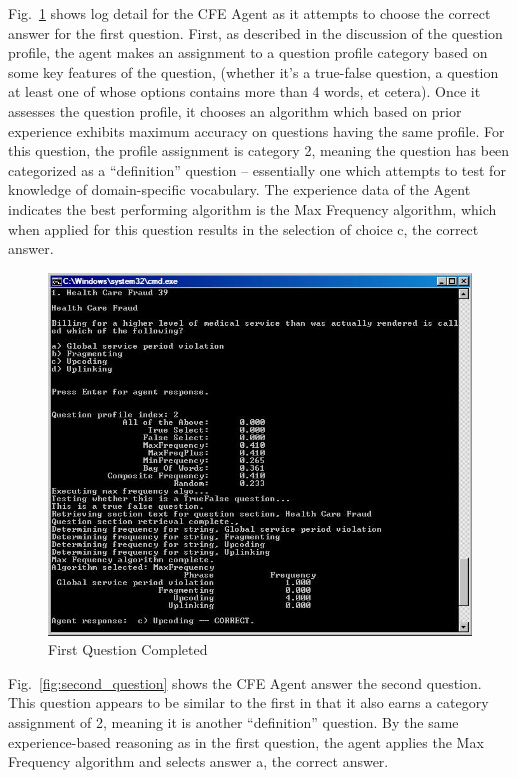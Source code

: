 Fig.~\ref{fig:first_question_completed} shows log detail for the CFE Agent as it attempts to choose the correct answer for the first question.  First, as described in the discussion of the question profile, the agent makes an assignment to a question profile category based on some key features of the question, (whether it's a true-false question, a question at least one of whose options contains more than 4 words, et cetera).  Once it assesses the question profile, it chooses an algorithm which based on prior experience exhibits maximum accuracy on questions having the same profile.  For this question, the profile assignment is category 2, meaning the question has been categorized as a ``definition'' question – essentially one which attempts to test for knowledge of domain-specific vocabulary.  The experience data of the Agent indicates the best performing algorithm is the Max Frequency algorithm, which when applied for this question results in the selection of choice c, the correct answer.

\begin{figure}
\centering
\includegraphics[scale=0.75]{screen_shot_4.jpg}
\caption{First Question Completed}
\label{fig:first_question_completed}
\end{figure}

Fig.~\ref{fig:second_question} shows the CFE Agent answer the second question.  This question appears to be similar to the first in that it also earns a category assignment of 2, meaning it is another ``definition'' question.  By the same experience-based reasoning as in the first question, the agent applies the Max Frequency algorithm and selects answer a, the correct answer.


